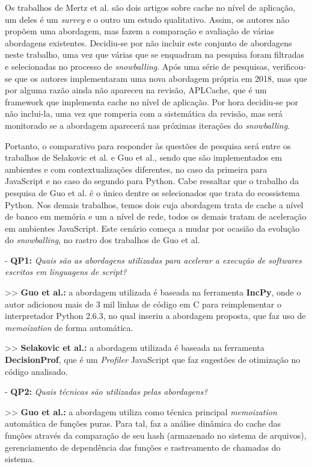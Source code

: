 \documentclass[sigconf]{acmart}
\begin{document}
Os trabalhos de Mertz et al. são dois artigos sobre cache no nível de aplicação, um deles é um \textit{survey} e o outro um estudo qualitativo. Assim, os autores não propõem uma abordagem, mas fazem a comparação e avaliação de várias abordagens existentes. Decidiu-se por não incluir este conjunto de abordagens neste trabalho, uma vez que várias que se enquadram na pesquisa foram filtradas e selecionadas no processo de \textit{snowballing}. Após uma série de pesquisas, verificou-se que os autores implementaram uma nova abordagem própria em 2018, mas que por alguma razão ainda não apareceu na revisão, APLCache, que é um framework que implementa cache no nível de aplicação. Por hora decidiu-se por não inclui-la, uma vez que romperia com a sistemática da revisão, mas será monitorado se a abordagem aparecerá nas próximas iterações do \textit{snowballing}.

Portanto, o comparativo para responder às questões de pesquisa será entre os trabalhos de Selakovic et al. e Guo et al., sendo que são implementados em ambientes e com contextualizações diferentes, no caso da primeira para JavaScript e no caso do segundo para Python. Cabe ressaltar que o trabalho da pesquisa de Guo et al. é o único dentre os selecionados que trata do ecossistema Python. Nos demais trabalhos, temos dois cuja abordagem trata de cache a nível de banco em memória e um a nível de rede, todos os demais tratam de aceleração em ambientes JavaScript. Este cenário começa a mudar por ocasião da evolução do \textit{snowballing}, no rastro dos trabalhos de Guo et al.

- \textbf{QP1:} {\textit{Quais são as abordagens utilizadas para acelerar a execução de softwares escritos em linguagens de script?}}

>> \textbf{Guo et al.:} a abordagem utilizada é baseada na ferramenta \textbf{IncPy}, onde o autor adicionou mais de 3 mil linhas de código em C para reimplementar o interpretador Python 2.6.3, no qual inseriu a abordagem proposta, que faz uso de \textit{memoization} de forma automática.

>> \textbf{Selakovic et al.:} a abordagem utilizada é baseada na ferramenta \textbf{DecisionProf}, que é um \textit{Profiler} JavaScript que faz sugestões de otimização no código analisado.

- \textbf{QP2:} {\textit{Quais técnicas são utilizadas pelas abordagens?}}

>> \textbf{Guo et al.:} a abordagem utiliza como técnica principal \textit{memoization} automática de funções puras. Para tal, faz a análise dinâmica do cache das funções através da comparação de seu hash (armazenado no sistema de arquivos), gerenciamento de dependência das funções e rastreamento de chamadas do sistema.
\end{document}

